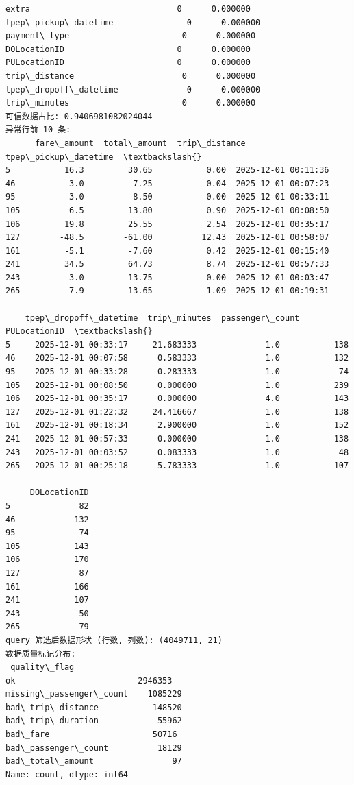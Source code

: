 \documentclass[11pt]{article}
\begin{document}
\begin{Verbatim}[commandchars=\\\{\}]
extra                              0      0.000000
tpep\_pickup\_datetime               0      0.000000
payment\_type                       0      0.000000
DOLocationID                       0      0.000000
PULocationID                       0      0.000000
trip\_distance                      0      0.000000
tpep\_dropoff\_datetime              0      0.000000
trip\_minutes                       0      0.000000
可信数据占比: 0.9406981082024044
异常行前 10 条:
      fare\_amount  total\_amount  trip\_distance tpep\_pickup\_datetime  \textbackslash{}
5           16.3         30.65           0.00  2025-12-01 00:11:36
46          -3.0         -7.25           0.04  2025-12-01 00:07:23
95           3.0          8.50           0.00  2025-12-01 00:33:11
105          6.5         13.80           0.90  2025-12-01 00:08:50
106         19.8         25.55           2.54  2025-12-01 00:35:17
127        -48.5        -61.00          12.43  2025-12-01 00:58:07
161         -5.1         -7.60           0.42  2025-12-01 00:15:40
241         34.5         64.73           8.74  2025-12-01 00:57:33
243          3.0         13.75           0.00  2025-12-01 00:03:47
265         -7.9        -13.65           1.09  2025-12-01 00:19:31

    tpep\_dropoff\_datetime  trip\_minutes  passenger\_count  PULocationID  \textbackslash{}
5     2025-12-01 00:33:17     21.683333              1.0           138
46    2025-12-01 00:07:58      0.583333              1.0           132
95    2025-12-01 00:33:28      0.283333              1.0            74
105   2025-12-01 00:08:50      0.000000              1.0           239
106   2025-12-01 00:35:17      0.000000              4.0           143
127   2025-12-01 01:22:32     24.416667              1.0           138
161   2025-12-01 00:18:34      2.900000              1.0           152
241   2025-12-01 00:57:33      0.000000              1.0           138
243   2025-12-01 00:03:52      0.083333              1.0            48
265   2025-12-01 00:25:18      5.783333              1.0           107

     DOLocationID
5              82
46            132
95             74
105           143
106           170
127            87
161           166
241           107
243            50
265            79
query 筛选后数据形状 (行数, 列数): (4049711, 21)
数据质量标记分布:
 quality\_flag
ok                         2946353
missing\_passenger\_count    1085229
bad\_trip\_distance           148520
bad\_trip\_duration            55962
bad\_fare                     50716
bad\_passenger\_count          18129
bad\_total\_amount                97
Name: count, dtype: int64
    \end{Verbatim}
\end{document}
